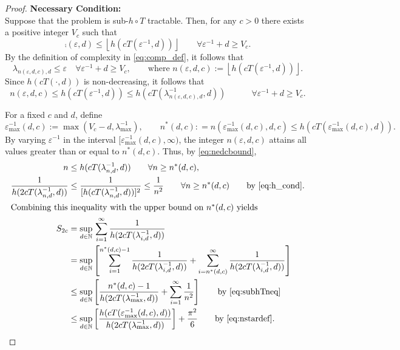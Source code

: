 \documentclass[11pt,a4paper]{article}
\begin{document}
\begin{proof}
\bigskip
	  
\noindent \textbf{Necessary Condition:}\\
Suppose that the problem is  sub-$h \circ T$ tractable. Then, for any $c>0$ there exists a positive integer $V_c$ such that  
\[
	\comp(\varepsilon,d)\le 
	\left\lfloor h(cT(\varepsilon^{-1},d)) \right\rfloor \qquad \forall \varepsilon^{-1} + d \ge V_c.
\]
By the definition of complexity in \eqref{eq:comp_def}, it follows that 
\[
	\lambda_{n(\varepsilon,d,c),d} \le \varepsilon \quad \forall \varepsilon^{-1} + d \ge V_c, \qquad \text{where }
	n(\varepsilon,d,c):=\left\lfloor h(cT(\varepsilon^{-1},d)) \right\rfloor.
\]
Since $h(cT(\cdot,d))$ is non-decreasing, it follows that
\begin{equation}
		n(\varepsilon,d,c)\le  h(cT(\varepsilon^{-1},d)) \le  h(cT(\lambda^{-1}_{n(\varepsilon,d,c),d},d)) \qquad  \quad \forall \varepsilon^{-1} + d \ge V_c. \label{eq:nedcbound}
\end{equation}
	
For a fixed $c$ and $d$, define
\begin{equation} \label{eq:nstardef}
	\varepsilon^{-1}_{\max}(d,c) := \max(V_c - d,\lambda_{\max}^{-1}), \qquad n^*(d,c) : = n(\varepsilon^{-1}_{\max}(d,c),d,c) \le h(cT(\varepsilon^{-1}_{\max}(d,c),d)).
\end{equation} 
By varying $\varepsilon^{-1}$ in the interval $[\varepsilon^{-1}_{\max}(d,c),\infty)$,  the integer $n(\varepsilon,d,c)$ attains all values greater than or equal to $n^*(d,c)$.  Thus, by \eqref{eq:nedcbound},
\begin{align}
		n &\le h(cT(\lambda^{-1}_{n,d},d)) \qquad  \forall n \ge n^*(d,c), \label{eq:subhTneq}\\
		\nonumber
		\frac{1}{h(2 cT(\lambda^{-1}_{n,d},d)) } & \le \frac{1}{[h(cT(\lambda^{-1}_{n,d},d))]^{2}}  \le \frac 1{n^2}   \qquad  \forall n \ge n^*(d,c) \qquad \text{by \eqref{eq:h_cond}}. \\
		\intertext{Combining this inequality with the upper bound on $n^*(d,c)$ yields}
		\nonumber
		S_{2c} & =\sup_{d\in\mathbb{N}}  \, \sum_{i=1}^\infty \frac1{h(2cT(\lambda_{i,d}^{-1},d))} \\
		\nonumber
		&  = \sup_{d\in\mathbb{N}} \left [
		\sum_{i=1}^{n^*(d,c)-1} \frac1{h(2cT(\lambda_{i,d}^{-1},d))}
		+ \sum_{i=n^*(d,c)}^\infty \frac1{h(2cT(\lambda_{i,d}^{-1},d))} 
		\right]\\
		 \nonumber
		 & \le \sup_{d\in\mathbb{N}} \left [
\frac{n^*(d,c)-1}{h(2cT(\lambda_{\max}^{-1},d))}
+ \sum_{i=1}^\infty \frac1{n^2}
\right] 
 \qquad \text{by \eqref{eq:subhTneq}}\\ 
 \label{eq:lastone}
		 & \le \sup_{d\in\mathbb{N}} \left [
		 \frac{ h(cT(\varepsilon^{-1}_{\max}(d,c),d))}{h(2cT(\lambda_{\max}^{-1},d))}
		\right] + \frac{\pi^2}{6}
		\qquad \text{by \eqref{eq:nstardef}.}
\end{align}


\end{proof}
\end{document}
